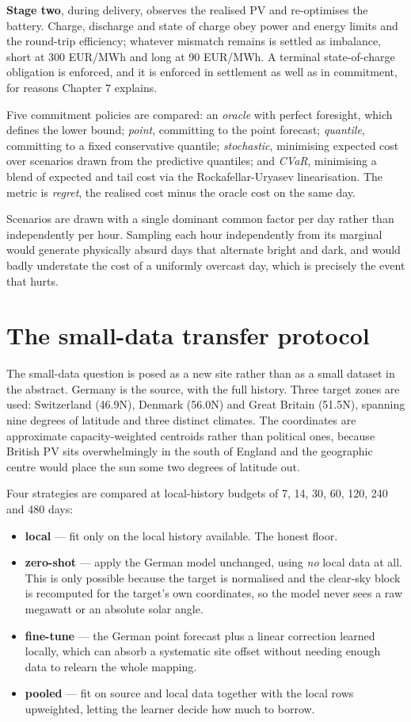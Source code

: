 \documentclass[11pt,a4paper,oneside]{report}
\begin{document}
\textbf{Stage two}, during delivery, observes the realised PV and re-optimises the battery. Charge, discharge and state of charge obey power and energy limits and the round-trip efficiency; whatever mismatch remains is settled as imbalance, short at 300 EUR/MWh and long at 90 EUR/MWh. A terminal state-of-charge obligation is enforced, and it is enforced in settlement as well as in commitment, for reasons Chapter 7 explains.

Five commitment policies are compared: an \emph{oracle} with perfect foresight, which defines the lower bound; \emph{point}, committing to the point forecast; \emph{quantile}, committing to a fixed conservative quantile; \emph{stochastic}, minimising expected cost over scenarios drawn from the predictive quantiles; and \emph{CVaR}, minimising a blend of expected and tail cost via the Rockafellar-Uryasev linearisation. The metric is \emph{regret}, the realised cost minus the oracle cost on the same day.

Scenarios are drawn with a single dominant common factor per day rather than independently per hour. Sampling each hour independently from its marginal would generate physically absurd days that alternate bright and dark, and would badly understate the cost of a uniformly overcast day, which is precisely the event that hurts.

\section{The small-data transfer protocol}

The small-data question is posed as a new site rather than as a small dataset in the abstract. Germany is the source, with the full history. Three target zones are used: Switzerland (46.9\textdegree N), Denmark (56.0\textdegree N) and Great Britain (51.5\textdegree N), spanning nine degrees of latitude and three distinct climates. The coordinates are approximate capacity-weighted centroids rather than political ones, because British PV sits overwhelmingly in the south of England and the geographic centre would place the sun some two degrees of latitude out.

Four strategies are compared at local-history budgets of 7, 14, 30, 60, 120, 240 and 480 days:

\begin{itemize}
\item \textbf{local} --- fit only on the local history available. The honest floor.
\item \textbf{zero-shot} --- apply the German model unchanged, using \emph{no} local data at all. This is only possible because the target is normalised and the clear-sky block is recomputed for the target's own coordinates, so the model never sees a raw megawatt or an absolute solar angle.
\item \textbf{fine-tune} --- the German point forecast plus a linear correction learned locally, which can absorb a systematic site offset without needing enough data to relearn the whole mapping.
\item \textbf{pooled} --- fit on source and local data together with the local rows upweighted, letting the learner decide how much to borrow.
\end{itemize}
\end{document}
